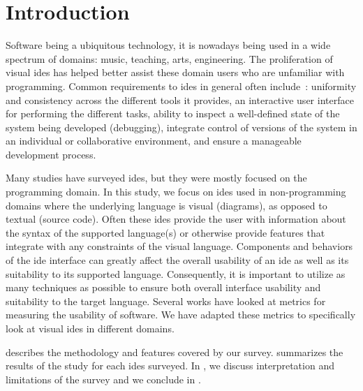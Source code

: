 \section{Introduction} \label{sec:introduction}

Software being a ubiquitous technology, it is nowadays being used in a wide spectrum of domains: music, teaching, arts, engineering.
The proliferation of visual \acfp{ide} has helped better assist these domain users who are unfamiliar with programming.
Common requirements to \acp{ide} in general often include~\cite{habermann1986}: uniformity and consistency across the different tools it provides, an interactive user interface for performing the different tasks, ability to inspect a well-defined state of the system being developed (\eg debugging), integrate control of versions of the system in an individual or collaborative environment, and ensure a manageable development process.

Many studies have surveyed \acp{ide}, but they were mostly focused on the programming domain.
In this study, we focus on \acp{ide} used in non-programming domains where the underlying language is visual (\eg diagrams), as opposed to textual (\eg source code).
Often these \acp{ide} provide the user with information about the syntax of the supported language(s) or otherwise provide features that integrate with any constraints of the visual language.
Components and behaviors of the \ac{ide} interface can greatly affect the overall usability of an \ac{ide} as well as its suitability to its supported language.
Consequently, it is important to utilize as many techniques as possible to ensure both overall interface usability and suitability to the target language.
Several works have looked at metrics for measuring the usability of software.
We have adapted these metrics to specifically look at visual \acp{ide} in different domains.

 describes the methodology and features covered by our survey.
 summarizes the results of the study for each \acp{ide} surveyed.
In , we discuss interpretation and limitations of the survey and we conclude in .

